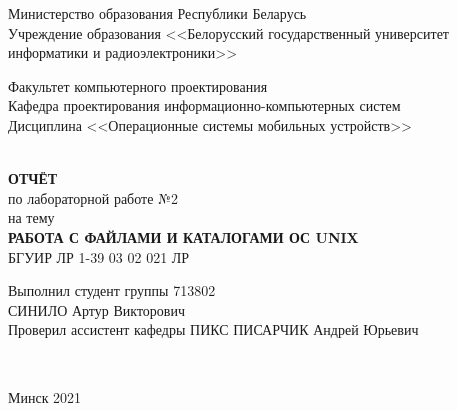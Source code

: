 
\begin{titlepage}
  \begin{center}
    Министерство образования Республики Беларусь\\
    Учреждение образования <<Белорусский государственный университет информатики и радиоэлектроники>>\\[2em]

    \begin{minipage}{\textwidth}
      \begin{flushleft}
		  Факультет компьютерного проектирования\\[1em]

		  Кафедра проектирования информационно-компьютерных систем\\[1em]

          Дисциплина <<Операционные системы мобильных устройств>>
      \end{flushleft}
    \end{minipage}\\[5em]

	\textbf{\MakeTextUppercase{Отчёт}}\\
    {по лабораторной работе №2}\\
	{на тему}\\[1em]
	\textbf{\MakeTextUppercase{РАБОТА С ФАЙЛАМИ И КАТАЛОГАМИ ОС UNIX}}\\[1em]

	{БГУИР ЛР 1-39 03 02 021 ЛР}\\[5em]

    \begin{flushright}
      \begin{minipage}{0.5\textwidth}
        \begin{flushleft}
          Выполнил студент группы 713802\\
		  \MakeTextUppercase{Синило} Артур Викторович\\[2em]

          Проверил ассистент кафедры ПИКС
		  \MakeTextUppercase{Писарчик} Андрей Юрьевич
        \end{flushleft}
      \end{minipage}\\[2.2em]
    \end{flushright}

        \vfill
    {\normalsize Минск 2021}
  \end{center}
\end{titlepage}
